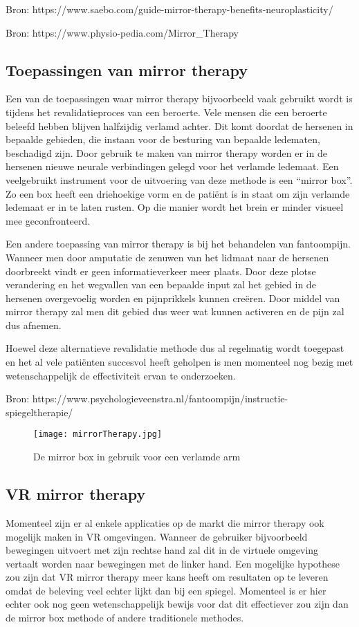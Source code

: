 Bron: https://www.saebo.com/guide-mirror-therapy-benefits-neuroplasticity/

Bron: https://www.physio-pedia.com/Mirror\_Therapy

\subsection{Toepassingen van mirror therapy}
Een van de toepassingen waar mirror therapy bijvoorbeeld vaak gebruikt wordt is tijdens het revalidatieproces van een beroerte.  Vele mensen die een beroerte beleefd hebben blijven halfzijdig verlamd achter. Dit komt doordat de hersenen in bepaalde gebieden, die instaan voor de besturing van bepaalde ledematen, beschadigd zijn. Door gebruik te maken van mirror therapy worden er in de hersenen nieuwe neurale verbindingen gelegd voor het verlamde ledemaat. Een veelgebruikt instrument voor de uitvoering van deze methode is een “mirror box”. Zo een box heeft een driehoekige vorm en de patiënt is in staat om zijn verlamde ledemaat er in te laten rusten. Op die manier wordt het brein er minder visueel mee geconfronteerd.



Een andere toepassing van mirror therapy is bij het behandelen van fantoompijn. Wanneer men door amputatie de zenuwen van het lidmaat naar de hersenen doorbreekt vindt er geen informatieverkeer meer plaats. Door deze plotse verandering en het wegvallen van een bepaalde input zal het gebied in de hersenen overgevoelig worden en pijnprikkels kunnen creëren. Door middel van mirror therapy zal men dit gebied dus weer wat kunnen activeren en de pijn zal dus afnemen.

Hoewel deze alternatieve revalidatie methode dus al regelmatig wordt toegepast en het al vele patiënten succesvol heeft geholpen is men momenteel nog bezig met wetenschappelijk de effectiviteit ervan te onderzoeken.

Bron: https://www.psychologieveenstra.nl/fantoompijn/instructie-spiegeltherapie/


\begin{figure}[h]
    \centering
    \texttt{[image: mirrorTherapy.jpg]}
    \caption{De mirror box in gebruik voor een verlamde arm}
\end{figure}

\subsection{VR mirror therapy}
Momenteel zijn er al enkele applicaties op de markt die mirror therapy ook mogelijk maken in VR omgevingen. Wanneer de gebruiker bijvoorbeeld bewegingen uitvoert met zijn rechtse hand zal dit in de virtuele omgeving vertaalt worden naar bewegingen met de linker hand. Een mogelijke hypothese zou zijn dat VR mirror therapy meer kans heeft om resultaten op te leveren omdat de beleving veel echter lijkt dan bij een spiegel. Momenteel is er hier echter ook nog geen wetenschappelijk bewijs voor dat dit effectiever zou zijn dan de mirror box methode of andere traditionele methodes. 


